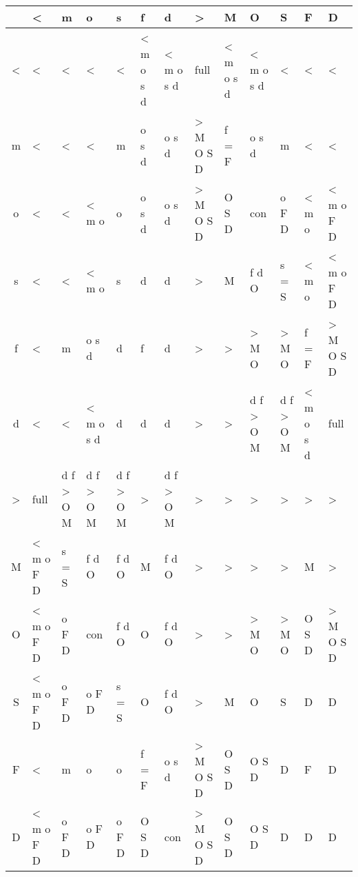 \begin{tabular}{|c||p{8mm}|p{8mm}|p{8mm}|p{8mm}|p{8mm}|p{8mm}|p{8mm}|p{8mm}|p{8mm}|p{8mm}|p{8mm}|p{8mm}|}
\hline
      & < & m & o & s & f & d & > & M & O & S & F & D \\ \hline\hline
    < & < & < & < & < & < m o s d & < m o s d & full & < m o s d & < m o s d & < & < & < \\ \hline
    m & < & < & < & m & o s d & o s d & > M O S D & f = F & o s d & m & < & < \\ \hline
    o & < & < & < m o & o & o s d & o s d & > M O S D & O S D & con & o F D & < m o & < m o F D \\ \hline
    s & < & < & < m o & s & d & d & > & M & f d O & s = S & < m o & < m o F D \\ \hline
    f & < & m & o s d & d & f & d & > & > & > M O & > M O & f = F & > M O S D \\ \hline
    d & < & < & < m o s d & d & d & d & > & > & d f > O M & d f > O M & < m o s d & full \\ \hline
    > & full & d f > O M & d f > O M & d f > O M & > & d f > O M & > & > & > & > & > & > \\ \hline
    M & < m o F D & s = S & f d O & f d O & M & f d O & > & > & > & > & M & > \\ \hline
    O & < m o F D & o F D & con & f d O & O & f d O & > & > & > M O & > M O & O S D & > M O S D \\ \hline
    S & < m o F D & o F D & o F D & s = S & O & f d O & > & M & O & S & D & D \\ \hline
    F & < & m & o & o & f = F & o s d & > M O S D & O S D & O S D & D & F & D \\ \hline
    D & < m o F D & o F D & o F D & o F D & O S D & con & > M O S D & O S D & O S D & D & D & D \\ \hline
\end{tabular}
